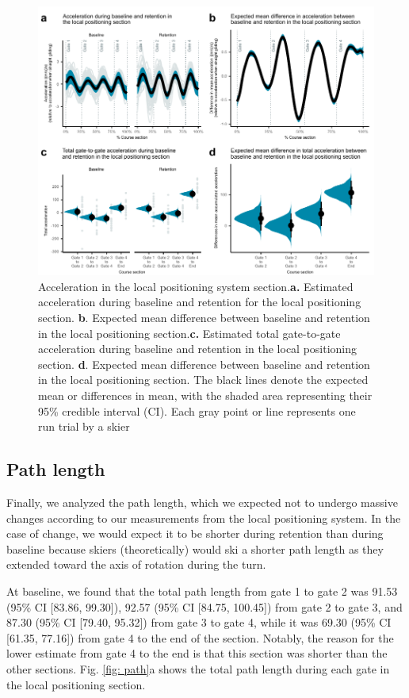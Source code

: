 \documentclass{article}
\begin{document}
\begin{figure}[H]
\centering
\includegraphics{figurer/figure_acc_2.pdf}
\caption{Acceleration in the local positioning system section.\textbf{a.} Estimated acceleration during baseline and retention for the local positioning section. \textbf{b}. Expected mean difference between baseline and retention in the local positioning section.\textbf{c.} Estimated total gate-to-gate acceleration during baseline and retention in the local positioning section. \textbf{d}. Expected mean difference between baseline and retention in the local positioning section. The black lines denote the expected mean or differences in mean, with the shaded area representing their 95\% credible interval (CI). Each gray point or line represents one run trial by a skier}\label{fig: acc}
\end{figure}

\subsection{Path length}
Finally, we analyzed the path length, which we expected not to undergo massive changes according to our measurements from the local positioning system. In the case of change, we would expect it to be shorter during retention than during baseline because skiers (theoretically) would ski a shorter path length as they extended toward the axis of rotation during the turn.

At baseline, we found that the total path length from gate 1 to gate 2 was 91.53 (95\% CI [83.86, 99.30]), 92.57 (95\% CI [84.75, 100.45]) from gate 2 to gate 3, and 87.30 (95\% CI [79.40, 95.32]) from gate 3 to gate 4, while it was 69.30 (95\% CI [61.35, 77.16]) from gate 4 to the end of the section. Notably, the reason for the lower estimate from gate 4 to the end is that this section was shorter than the other sections. Fig. \ref{fig: path}a shows the total path length during each gate in the local positioning section.
\end{document}
